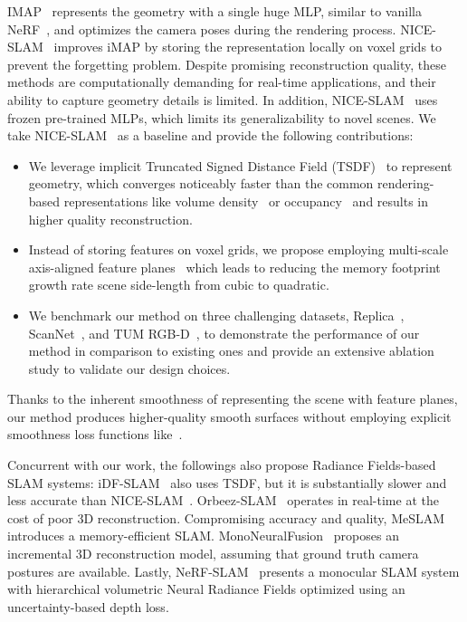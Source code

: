 IMAP~\citep{sucar2021imap} represents the geometry with a single huge MLP, similar to vanilla NeRF~\citep{mildenhall2020nerf}, and optimizes the camera poses during the rendering process. NICE-SLAM~\citep{zhu2022nice} improves iMAP by storing the representation locally on voxel grids to prevent the forgetting problem. Despite promising reconstruction quality, these methods are computationally demanding for real-time applications, and their ability to capture geometry details is limited. In addition, NICE-SLAM~\citep{zhu2022nice} uses frozen pre-trained MLPs, which limits its generalizability to novel scenes. We take NICE-SLAM~\citep{zhu2022nice} as a baseline and provide the following contributions:
\begin{itemize}
	\item We leverage implicit Truncated Signed Distance Field (TSDF)~\citep{azinovic2022neural} to represent geometry, which converges noticeably faster than the common rendering-based representations like volume density~\citep{sucar2021imap} or occupancy~\citep{zhu2022nice} and results in higher quality reconstruction.
	
	\item Instead of storing features on voxel grids, we propose employing multi-scale axis-aligned feature planes~\citep{chan2022efficient} which leads to reducing the memory footprint growth rate \wrt scene side-length from cubic to quadratic.
	
	\item We benchmark our method on three challenging datasets, Replica~\citep{replica19arxiv}, ScanNet~\citep{dai2017scannet}, and TUM RGB-D~\citep{sturm2012benchmark}, to demonstrate the performance of our method in comparison to existing ones and provide an extensive ablation study to validate our design choices.
	
\end{itemize}
Thanks to the inherent smoothness of representing the scene with feature planes, our method produces higher-quality smooth surfaces without employing explicit smoothness loss functions like~\cite{wang2022go}.

Concurrent with our work, the followings also propose Radiance Fields-based SLAM systems: iDF-SLAM~\citep{ming2022idf} also uses TSDF, but it is substantially slower and less accurate than NICE-SLAM~\citep{zhu2022nice}. Orbeez-SLAM~\citep{chung2022orbeez} operates in real-time at the cost of poor 3D reconstruction. Compromising accuracy and quality, MeSLAM~\citep{kruzhkov2022meslam} introduces a memory-efficient SLAM. MonoNeuralFusion~\citep{zou2022mononeuralfusion} proposes an incremental 3D reconstruction model, assuming that ground truth camera postures are available. Lastly, NeRF-SLAM~\citep{rosinol2022nerf} presents a monocular SLAM system with hierarchical volumetric Neural Radiance Fields optimized using an uncertainty-based depth loss.

